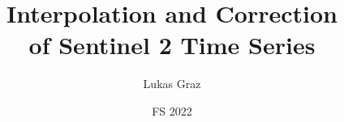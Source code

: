 \documentclass[11pt,aspectratio=169]{beamer}
\title{Interpolation and Correction
\\ of
Sentinel 2 Time Series}
\date[FS 2022]{FS 2022} %
\author{Lukas Graz}
\institute{D-MATH --- Seminar for Statistics \\ D-USYS --- Crop Science}
\begin{document}

\def\titlefigure{../latex/figures/satelite/sentinel-2-cover_cropped}
\titleframe




















% 
% 
\end{document}
